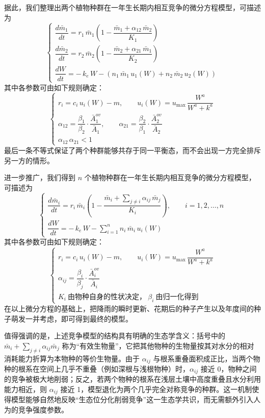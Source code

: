 \documentclass[11pt,a4paper]{ctexart}
\begin{document}
据此，我们整理出两个植物种群在一年生长期内相互竞争的微分方程模型，可描述为
\[
\begin{cases}
\dfrac{d\bar m_1}{dt}=r_1\,\bar m_1\left(1-\dfrac{\bar m_1+\alpha_{12}\,\bar m_2}{K_1}\right)\\[1.0em]
\dfrac{d\bar m_2}{dt}=r_2\,\bar m_2\left(1-\dfrac{\bar m_2+\alpha_{21}\,\bar m_1}{K_2}\right)\\[1.0em]
\dfrac{dW}{dt}=-\,k_e\,W-\left(n_1\,\bar m_1\,u_1(W)+n_2\,\bar m_2\,u_2(W)\right)
\end{cases}
\]
其中各参数可由如下规则确定：
\[
\begin{cases}
r_i=c_i\,u_i(W)-m,\qquad u_i(W)=u_{\max}\,\dfrac{W^{a}}{W^{a}+k^{a}}\\[0.8em]
\alpha_{12}=\dfrac{\beta_1}{\beta_2}\cdot\dfrac{\bar A_1^{ov}}{\bar A_1},\qquad
\alpha_{21}=\dfrac{\beta_2}{\beta_1}\cdot\dfrac{\bar A_2^{ov}}{\bar A_2}\\[0.8em]
\alpha_{12}\,\alpha_{21}<1
\end{cases}
\]
最后一条不等式保证了两个种群能够共存于同一平衡态，而不会出现一方完全排斥另一方的情形。

进一步推广，我们得到 $n$ 个植物种群在一年生长期内相互竞争的微分方程模型，可描述为
\[
\begin{cases}
\dfrac{d\bar m_i}{dt}=r_i\,\bar m_i\left(1-\dfrac{\bar m_i+\displaystyle\sum_{j\neq i}\alpha_{ij}\,\bar m_j}{K_i}\right),\qquad i=1,2,\dots,n\\[1.4em]
\dfrac{dW}{dt}=-\,k_e\,W-\displaystyle\sum_{i=1}^{n}n_i\,\bar m_i\,u_i(W)
\end{cases}
\]
其中各参数可由如下规则确定：
\[
\begin{cases}
r_i=c_i\,u_i(W)-m,\qquad u_i(W)=u_{\max}\,\dfrac{W^{a}}{W^{a}+k^{a}}\\[0.8em]
\alpha_{ij}=\dfrac{\beta_i}{\beta_j}\cdot\dfrac{\bar A_i^{ov}}{\bar A_i}\\[0.8em]
K_i\ \text{由物种自身的性状决定，}\ \beta_i\ \text{由归一化得到}
\end{cases}
\]
在以上微分方程的基础上，把降雨的瞬时更新、花期后的种子产生以及年度间的种子萌发一并考虑，即可得到最终的模型。

值得强调的是，上述竞争模型的结构具有明确的生态学含义：括号中的 $\bar m_i+\sum_{j\neq i}\alpha_{ij}\bar m_j$ 称为“有效生物量”，它把其他物种的生物量按其对水分的相对消耗能力折算为本物种的等价生物量。由于 $\alpha_{ij}$ 与根系重叠面积成正比，当两个物种的根系在空间上几乎不重叠（例如深根与浅根物种）时，$\alpha_{ij}$ 接近 0，物种之间的竞争被极大地削弱；反之，若两个物种的根系在浅层土壤中高度重叠且水分利用能力相近，则 $\alpha_{ij}$ 接近 1，模型退化为两个几乎完全对称竞争的种群。这一机制使得模型能够自然地反映“生态位分化削弱竞争”这一生态学共识，而无需额外引入人为的竞争强度参数。
\end{document}
